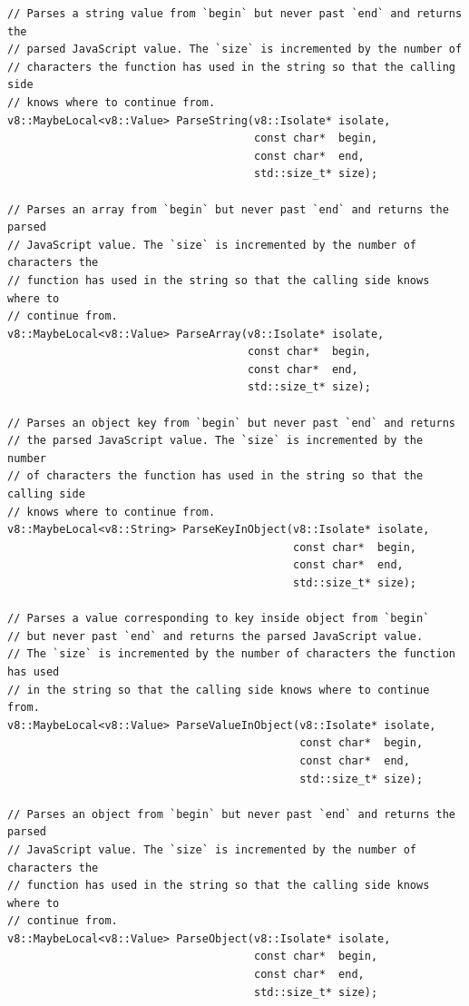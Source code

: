 \documentclass[%
  ukrainian, utf8, columnvii, simple,
  hpadding=10mm, vpadding=10mm, reduceheight=2mm,
  floatsection,
]{eskdtext}
\begin{document}
\begin{verbatim}
// Parses a string value from `begin` but never past `end` and returns the
// parsed JavaScript value. The `size` is incremented by the number of
// characters the function has used in the string so that the calling side
// knows where to continue from.
v8::MaybeLocal<v8::Value> ParseString(v8::Isolate* isolate,
                                      const char*  begin,
                                      const char*  end,
                                      std::size_t* size);

// Parses an array from `begin` but never past `end` and returns the parsed
// JavaScript value. The `size` is incremented by the number of characters the
// function has used in the string so that the calling side knows where to
// continue from.
v8::MaybeLocal<v8::Value> ParseArray(v8::Isolate* isolate,
                                     const char*  begin,
                                     const char*  end,
                                     std::size_t* size);

// Parses an object key from `begin` but never past `end` and returns
// the parsed JavaScript value. The `size` is incremented by the number
// of characters the function has used in the string so that the calling side
// knows where to continue from.
v8::MaybeLocal<v8::String> ParseKeyInObject(v8::Isolate* isolate,
                                            const char*  begin,
                                            const char*  end,
                                            std::size_t* size);

// Parses a value corresponding to key inside object from `begin`
// but never past `end` and returns the parsed JavaScript value.
// The `size` is incremented by the number of characters the function has used
// in the string so that the calling side knows where to continue from.
v8::MaybeLocal<v8::Value> ParseValueInObject(v8::Isolate* isolate,
                                             const char*  begin,
                                             const char*  end,
                                             std::size_t* size);

// Parses an object from `begin` but never past `end` and returns the parsed
// JavaScript value. The `size` is incremented by the number of characters the
// function has used in the string so that the calling side knows where to
// continue from.
v8::MaybeLocal<v8::Value> ParseObject(v8::Isolate* isolate,
                                      const char*  begin,
                                      const char*  end,
                                      std::size_t* size);


\end{verbatim}
\end{document}
